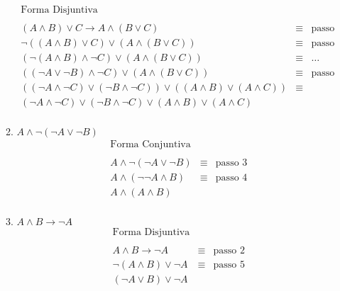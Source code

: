 \begin{enumerate}
\begin{enumerate}
\[\begin{array}{lcl}
						
						\text{Forma Disjuntiva} & & \\
						& & \\
						
						
						(A\land B)\lor C\rightarrow A\land(B\lor C) & \equiv & \text{passo 2}\\
												
						\neg ((A \land B)\lor C) \lor (A \land (B \lor C))& \equiv & \text{passo 3}\\
						
						
						(\neg (A \land B) \land \neg C) \lor (A \land (B \lor C)) & \equiv & \ldots \\
						
						
						((\neg A \lor \neg B) \land \neg C) \lor (A \land (B \lor C)) & \equiv & \text{passo 5}\\
						
						((\neg A \land \neg C) \lor (\neg B \land \neg C))\lor ((A \land B) \lor (A \land C)) & \equiv & \\
						
						(\neg A \land \neg C) \lor (\neg B \land \neg C)\lor (A \land B) \lor (A \land C) &  & \\

						\end{array}
					\]
				
				\item $A\land\neg (\neg A\lor \neg B)$
					\[
						\begin{array}{lcl}
							\text{Forma Conjuntiva} &  & \\
							& & \\
							A\land \neg (\neg A \lor \neg B) & \equiv & \text{passo 3} \\
							A \land (\neg \neg A \land B) & \equiv & \text{passo 4} \\
							A \land (A \land B) &  & \\
						\end{array}
					\]
				
				
				\item $A\land B\rightarrow\neg A$
						\[
							\begin{array}{lcl}
								\text{Forma Disjuntiva} & & \\
								& & \\
								A\land B\rightarrow\neg A & \equiv & \text{passo 2}\\
								\neg(A \land B) \lor \neg A & \equiv & \text{passo 5} \\
								(\neg A \lor B) \lor \neg A
							\end{array}
						\]
				

\end{enumerate}
\end{enumerate}
